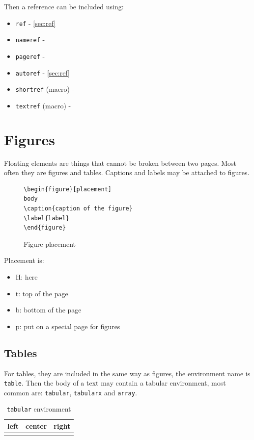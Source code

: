 Then a reference can be included using:
\begin{itemize}
\item \texttt{ref} - \ref{sec:ref}
\item \texttt{nameref} - 
\item \texttt{pageref} - \pageref{sec:ref}
\item \texttt{autoref} - \autoref{sec:ref}
\item \texttt{shortref} (macro) - 
\item \texttt{textref} (macro) - 
\end{itemize}

\section{Figures}

Floating elements are things that cannot be broken between two pages.
Most often they are figures and tables.
Captions and labels may be attached to figures.

\begin{figure}[H]
\centering
\begin{lstlisting}
\begin{figure}[placement]
body
\caption{caption of the figure}
\label{label}
\end{figure}
\end{lstlisting}
\caption{Figure placement}
\label{fig:figure-placement}
\end{figure}

Placement is:
\begin{itemize}
\item H: here
\item t: top of the page
\item b: bottom of the page
\item p: put on a special page for figures
\end{itemize}

\subsection{Tables}

For tables, they are included in the same way as figures, the environment name
is \texttt{table}.
Then the body of a text may contain a tabular environment, most common are:
\texttt{tabular}, \texttt{tabularx} and \texttt{array}.

\begin{table}[H]
\centering
\begin{tabular}{l|c|r}
\hline\hline
left & center & right \\
\hline
\hspace{2cm} & \hspace{2cm} & \hspace{2cm} \\
\end{tabular}
\caption{\texttt{tabular} environment}
\end{table}


